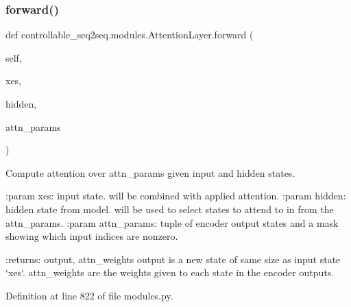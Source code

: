 \subsubsection{\texorpdfstring{forward()}{forward()}}
{\footnotesize\ttfamily def controllable\+\_\+seq2seq.\+modules.\+Attention\+Layer.\+forward (\begin{DoxyParamCaption}\item[{}]{self,  }\item[{}]{xes,  }\item[{}]{hidden,  }\item[{}]{attn\+\_\+params }\end{DoxyParamCaption})}

\begin{DoxyVerb}Compute attention over attn_params given input and hidden states.

:param xes:         input state. will be combined with applied
            attention.
:param hidden:      hidden state from model. will be used to select
            states to attend to in from the attn_params.
:param attn_params: tuple of encoder output states and a mask showing
            which input indices are nonzero.

:returns: output, attn_weights
  output is a new state of same size as input state `xes`.
  attn_weights are the weights given to each state in the
  encoder outputs.
\end{DoxyVerb}
 

Definition at line 822 of file modules.\+py.



